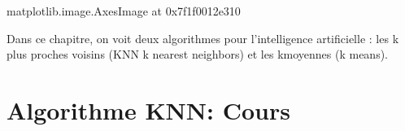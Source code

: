\documentclass[letterpaper,10pt,english]{jupyterBook}
\begin{document}
\begin{sphinxVerbatimOutput}

\begin{sphinxVerbatim}[commandchars=\\\{\}]
\PYGZlt{}matplotlib.image.AxesImage at 0x7f1f0012e310\PYGZgt{}
\end{sphinxVerbatim}

\noindent{}
\end{sphinxVerbatimOutput}
\begin{sphinxVerbatimInput}

\begin{sphinxVerbatim}[commandchars=\\\{\}]
   
   
   
\end{sphinxVerbatim}
\end{sphinxVerbatimInput}
\begin{sphinxVerbatimInput}

\begin{sphinxVerbatim}[commandchars=\\\{\}]
\end{sphinxVerbatim}
\end{sphinxVerbatimInput}

\sphinxAtStartPar
Dans ce chapitre, on voit deux algorithmes pour l’intelligence artificielle : les k plus
proches voisins (KNN k nearest neighbors) et les k\sphinxhyphen{}moyennes (k means).


\chapter{Algorithme KNN: Cours}
\label{\detokenize{notebooks/Machine-Learning/KNN-Cours:algorithme-knn-cours}}\label{\detokenize{notebooks/Machine-Learning/KNN-Cours::doc}}
\end{document}
